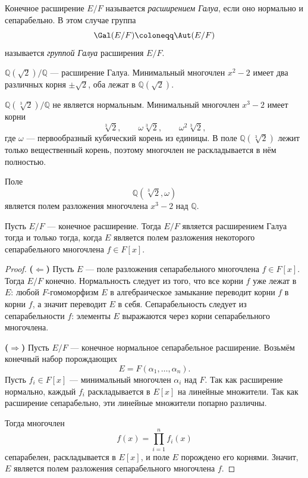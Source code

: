 \begin{definition}
Конечное расширение $E / F$ называется \emph{расширением Галуа}, если оно нормально и сепарабельно.
В этом случае группа
\[
    \Gal(E/F) \coloneqq \Aut(E/F)
\]
называется \emph{группой Галуа} расширения $E / F$.
\end{definition}

\begin{examplelist}
\item $\mathbb{Q}(\sqrt{2}) / \mathbb{Q}$ --- расширение Галуа. Минимальный многочлен $x^2 - 2$ имеет два различных корня
$\pm\sqrt{2}$, оба лежат в $\mathbb{Q}(\sqrt{2})$.

\item $\mathbb{Q}(\sqrt[3]{2}) / \mathbb{Q}$ не является нормальным. Минимальный многочлен $x^3 - 2$ имеет корни
\[
    \sqrt[3]{2}, \qquad \omega\sqrt[3]{2}, \qquad \omega^2\sqrt[3]{2},
\]
где $\omega$ --- первообразный кубический корень из единицы. В поле $\mathbb{Q}(\sqrt[3]{2})$ лежит только вещественный корень,
поэтому многочлен не раскладывается в нём полностью.

\item Поле
\[
    \mathbb{Q}(\sqrt[3]{2}, \omega)
\]
является полем разложения многочлена $x^3 - 2$ над $\mathbb{Q}$.
\end{examplelist}

\begin{theorem}
Пусть $E / F$ --- конечное расширение. Тогда $E / F$ является расширением Галуа тогда и только тогда,
когда $E$ является полем разложения некоторого сепарабельного многочлена $f \in F[x]$.

\begin{proof}
\textbf{($\Leftarrow$)} Пусть $E$ --- поле разложения сепарабельного многочлена $f \in F[x]$. Тогда $E/F$ конечно.
Нормальность следует из того, что все корни $f$ уже лежат в $E$: любой $F$-гомоморфизм $E$ в алгебраическое замыкание переводит корни
$f$ в корни $f$, а значит переводит $E$ в себя. Сепарабельность следует из сепарабельности $f$: элементы
$E$ выражаются через корни сепарабельного многочлена.

\textbf{($\Rightarrow$)} Пусть $E/F$ --- конечное нормальное сепарабельное расширение. Возьмём конечный набор порождающих
\[
    E = F(\alpha_1, \ldots, \alpha_n).
\]
Пусть $f_i \in F[x]$ --- минимальный многочлен $\alpha_i$ над $F$. Так как расширение нормально, каждый
$f_i$ раскладывается в $E[x]$ на линейные множители. Так как расширение сепарабельно, эти линейные множители попарно различны.

Тогда многочлен
\[
    f(x) = \prod_{i=1}^n f_i(x)
\]
сепарабелен, раскладывается в $E[x]$, и поле $E$ порождено его корнями. Значит, $E$ является полем разложения сепарабельного многочлена $f$.
\end{proof}
\end{theorem}

